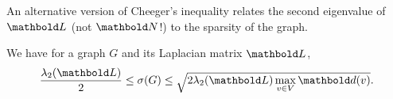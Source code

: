 An alternative version of Cheeger's inequality relates the second eigenvalue of $\mL$ (not $\mN$!) to the sparsity of the graph.

\begin{thm} We have for a graph $G$ and its Laplacian matrix $\mL$, \begin{align}
    \frac{\lambda_2(\mL)}{2} \leq \sigma(G) \leq \sqrt{2 \lambda_2(\mL) \max_{v \in \sV} \vd(v)}.
\end{align}
\end{thm}
